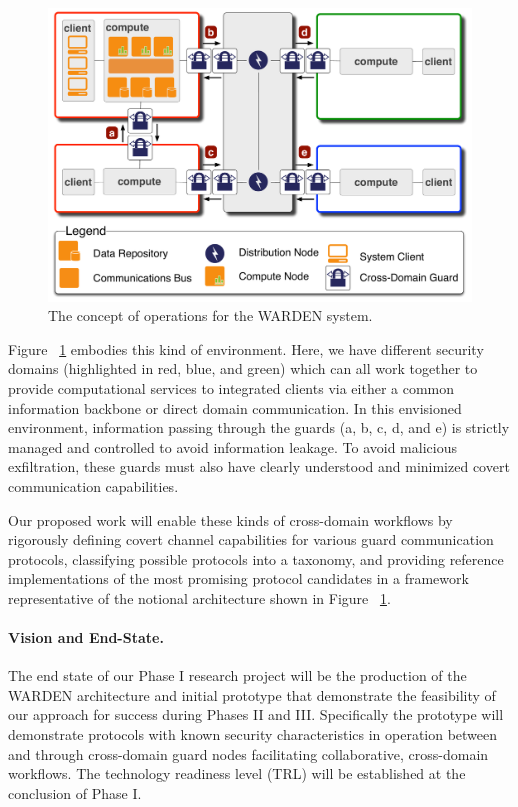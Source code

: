\documentclass{sbir}
\begin{document}
\begin{figure}
\vspace{-0.2in}
\centerline{\includegraphics[width=6in]{./images/warden-conops.pdf}}
\vspace{-0.1in}
\caption{The concept of operations for the WARDEN system.}
\label{conops}
\end{figure}

Figure ~\ref{conops} embodies this kind of environment. Here, we have different security domains (highlighted in red, blue, and green) which can all work together to provide computational services to integrated clients via either a common information backbone or direct domain communication. In this envisioned environment, information passing through the guards (a, b, c, d, and e) is strictly managed and controlled to avoid information leakage. To avoid malicious exfiltration, these guards must also have clearly understood and minimized covert communication capabilities.

Our proposed work will enable these kinds of cross-domain workflows by rigorously defining covert channel capabilities for various guard communication protocols, classifying possible protocols into a taxonomy, and providing reference implementations of the most promising protocol candidates in a framework representative of the notional architecture shown in Figure ~\ref{conops}.

\paragraph{Vision and End-State.} The end state of our Phase I research project will be the production of the WARDEN architecture and initial prototype that demonstrate the feasibility of our approach for success during Phases II and III. Specifically the prototype will demonstrate protocols with known security characteristics in operation between and through cross-domain guard nodes facilitating collaborative, cross-domain workflows. The technology readiness level (TRL) will be established at the conclusion of Phase I.
\end{document}
